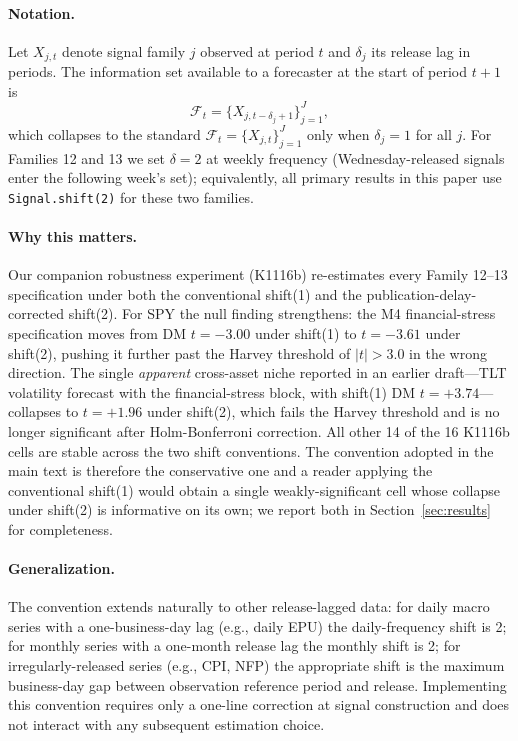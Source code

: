 \documentclass[12pt,a4paper]{article}
\begin{document}
\paragraph{Notation.} Let $X_{j,t}$ denote signal family $j$ observed at period $t$ and $\delta_j$ its release lag in periods. The information set available to a forecaster at the start of period $t+1$ is
\begin{equation}
\mathcal{F}_t = \{X_{j,t-\delta_j+1}\}_{j=1}^{J},
\label{eq:info_set_pub_delay}
\end{equation}
which collapses to the standard $\mathcal{F}_t = \{X_{j,t}\}_{j=1}^J$ only when $\delta_j = 1$ for all $j$. For Families 12 and 13 we set $\delta = 2$ at weekly frequency (Wednesday-released signals enter the following week's set); equivalently, all primary results in this paper use \texttt{Signal.shift(2)} for these two families.

\paragraph{Why this matters.} Our companion robustness experiment (K1116b) re-estimates every Family 12--13 specification under both the conventional shift(1) and the publication-delay-corrected shift(2). For SPY the null finding strengthens: the M4 financial-stress specification moves from DM $t=-3.00$ under shift(1) to $t=-3.61$ under shift(2), pushing it further past the Harvey threshold of $|t|>3.0$ in the wrong direction. The single \emph{apparent} cross-asset niche reported in an earlier draft---TLT volatility forecast with the financial-stress block, with shift(1) DM $t=+3.74$---collapses to $t=+1.96$ under shift(2), which fails the Harvey threshold and is no longer significant after Holm-Bonferroni correction. All other 14 of the 16 K1116b cells are stable across the two shift conventions. The convention adopted in the main text is therefore the conservative one and a reader applying the conventional shift(1) would obtain a single weakly-significant cell whose collapse under shift(2) is informative on its own; we report both in Section~\ref{sec:results} for completeness.

\paragraph{Generalization.} The convention extends naturally to other release-lagged data: for daily macro series with a one-business-day lag (e.g., daily EPU) the daily-frequency shift is 2; for monthly series with a one-month release lag the monthly shift is 2; for irregularly-released series (e.g., CPI, NFP) the appropriate shift is the maximum business-day gap between observation reference period and release. Implementing this convention requires only a one-line correction at signal construction and does not interact with any subsequent estimation choice.
\end{document}
